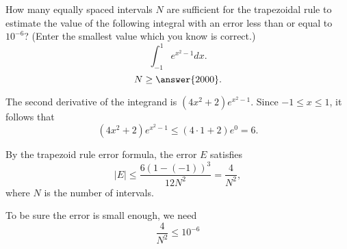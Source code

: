 \documentclass{ximera}
\begin{document}
\begin{exercise}%
How many equally spaced intervals $N$ are sufficient for the trapezoidal rule to estimate the value of the following integral  with an error less than or equal to $10^{-6}$? (Enter the smallest value which you know is correct.)
  \[ \int_{-1}^1 e^{x^2-1} dx. \]
  \[ N \geq \answer{2000}. \]
\begin{hint}
The second derivative of the integrand is $(4x^2 + 2) e^{x^2 - 1}$. Since $-1 \leq x \leq 1$, it follows that
\[ (4x^2 + 2) e^{x^2 - 1} \leq (4 \cdot 1 + 2) e^{0} = 6. \]
\begin{hint}
By the trapezoid rule error formula, the error $E$ satisfies
\[ |E| \leq \frac{6 (1 - (-1))^3}{12N^2} = \frac{4}{N^2}, \]
where $N$ is the number of intervals. 
\begin{hint}
To be sure the error is small enough, we need
\[ \frac{4}{N^2} \leq 10^{-6} \]
\end{hint}
\end{hint}
\end{hint}
\end{exercise}
\end{document}
